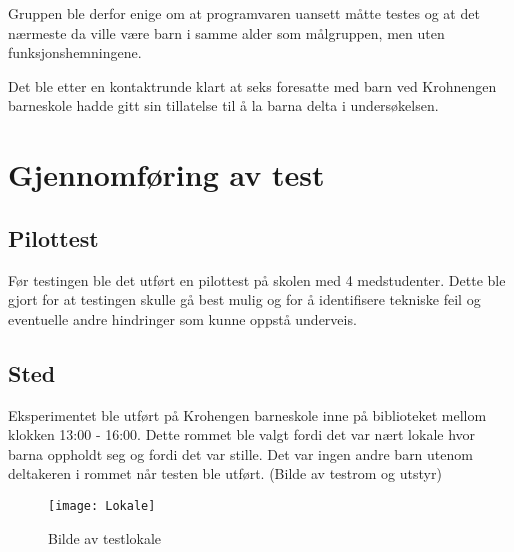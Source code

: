 Gruppen ble derfor enige om at programvaren uansett måtte testes og at det nærmeste da ville være barn i samme alder som målgruppen, men uten funksjonshemningene. 

Det ble etter en kontaktrunde klart at seks foresatte med barn ved Krohnengen barneskole hadde gitt sin tillatelse til å la barna delta i undersøkelsen. 
 
 
\section{Gjennomføring av test} 
 
 
\subsection{Pilottest} 
 
 
Før testingen ble det utført en pilottest på skolen med 4 medstudenter. Dette ble gjort for at testingen skulle gå best mulig og for å identifisere tekniske feil og eventuelle andre hindringer som kunne oppstå underveis.  
 
 
\subsection{Sted} 
Eksperimentet ble utført på Krohengen barneskole inne på biblioteket mellom klokken 13:00 - 
16:00. Dette rommet ble valgt fordi det var nært lokale hvor barna oppholdt seg og fordi det var 
stille. Det var ingen andre barn utenom deltakeren i rommet når testen ble utført. 
(Bilde av testrom og utstyr)  
 
 
\begin{figure}[ht!] 
\centering 
\texttt{[image: Lokale]} 
\caption{Bilde av testlokale} 
\label{fig:test_lokale} 
\end{figure} 
 
 
 
 
